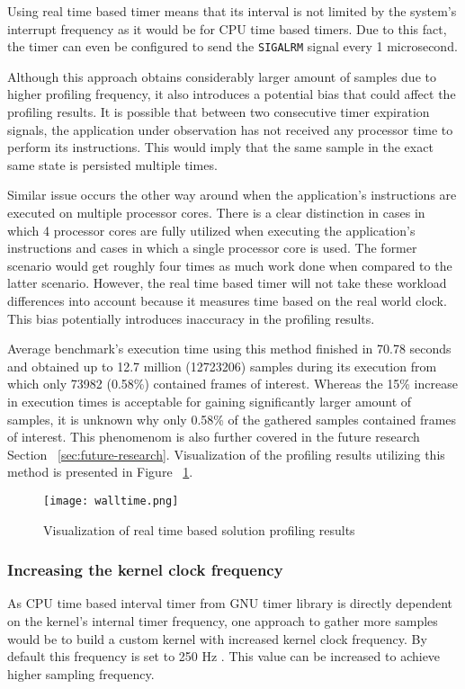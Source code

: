 \documentclass[..thesis.tex]{subfiles}
\begin{document}
Using real time based timer means that its interval is not limited by the system's interrupt frequency as it would be for CPU time based timers. Due to this fact, the timer can even be configured to send the \texttt{SIGALRM} signal every 1 microsecond.

Although this approach obtains considerably larger amount of samples due to higher profiling frequency, it also introduces a potential bias that could affect the profiling results. It is possible that between two consecutive timer expiration signals, the application under observation has not received any processor time to perform its instructions. This would imply that the same sample in the exact same state is persisted multiple times. 

Similar issue occurs the other way around when the application's instructions are executed on multiple processor cores. There is a clear distinction in cases in which 4 processor cores are fully utilized when executing the application's instructions and cases in which a single processor core is used. The former scenario would get roughly four times as much work done when compared to the latter scenario. However, the real time based timer will not take these workload differences into account because it measures time based on the real world clock. This bias potentially introduces inaccuracy in the profiling results.

Average benchmark's execution time using this method finished in 70.78 seconds and obtained up to 12.7 million (12723206) samples during its execution from which only 73982 (0.58\%) contained frames of interest. Whereas the 15\% increase in execution times is acceptable for gaining significantly larger amount of samples, it is unknown why only 0.58\% of the gathered samples contained frames of interest. This phenomenom is also further covered in the future research Section ~\ref{sec:future-research}. Visualization of the profiling results utilizing this method is presented in Figure ~\ref{fig:walltime}.
\begin{figure}[H]
\texttt{[image: walltime.png]}
\caption{Visualization of real time based solution profiling results}
\label{fig:walltime}
\end{figure}

\subsubsection{Increasing the kernel clock frequency}
\label{kernel-clock}
As CPU time based interval timer from GNU timer library is directly dependent on the kernel's internal timer frequency, one approach to gather more samples would be to build a custom kernel with increased kernel clock frequency. By default this frequency is set to 250 Hz \cite{torvalds_linux:_2018}. This value can be increased to achieve higher sampling frequency. 
\end{document}
